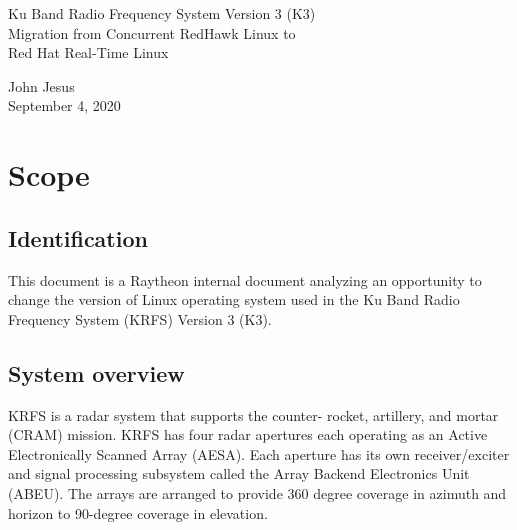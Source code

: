 \documentclass[12pt]{article}
\begin{document}
\thispagestyle{empty}
\begin{titlepage}
\begin{center}
        \vspace*{1cm}

        \LARGE{Ku Band Radio Frequency System Version 3 (K3) \\
        Migration from Concurrent RedHawk Linux to \\
        Red Hat Real-Time Linux}

        \vspace{0.5cm}
        \LARGE

        \vspace{1.5cm}

        \normalsize

        John Jesus \\
        September 4, 2020

        \vfill



        \vspace{0.8cm}




\end{center}
\end{titlepage}

\tableofcontents

%
\newpage
\section{Scope}
\subsection{Identification}
This document is a Raytheon internal document analyzing an opportunity to change
the version of Linux operating system used in the Ku Band Radio Frequency System
(KRFS) Version 3 (K3).

\subsection{System overview}
KRFS is a radar system that supports the counter- rocket, artillery, and mortar
(CRAM) mission.  KRFS has four radar apertures each operating as an Active
Electronically Scanned Array (AESA).  Each aperture has its own receiver/exciter
and signal processing subsystem called the Array Backend Electronics Unit
(ABEU).  The arrays are arranged to provide 360 degree coverage in azimuth and
horizon to 90-degree coverage in elevation.
\end{document}
